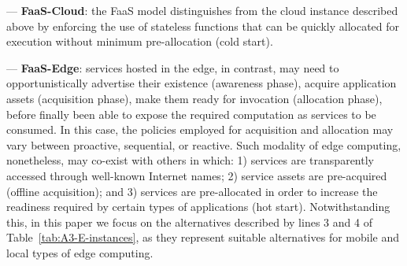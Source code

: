 --- \textbf{FaaS-Cloud}: the FaaS model distinguishes from the cloud instance described above by enforcing the use of stateless functions that can be quickly allocated for execution without minimum pre-allocation (cold start).

--- \textbf{FaaS-Edge}: services hosted in the edge, in contrast, may need to opportunistically advertise their existence (awareness phase), acquire application assets (acquisition phase), make them ready for invocation (allocation phase), before finally been able to expose the required computation as services to be consumed. In this case, the policies employed for acquisition and allocation may vary between proactive, sequential, or reactive. Such modality of edge computing, nonetheless, may co-exist with others in which: 1) services are transparently accessed through well-known Internet names; 2) service assets are pre-acquired (offline acquisition); and 3) services are pre-allocated in order to increase the readiness required by certain types of applications (hot start). Notwithstanding this, in this paper we focus on the alternatives described by lines 3 and 4 of Table~\ref{tab:A3-E-instances}, as they represent suitable alternatives for mobile and local types of edge computing.

